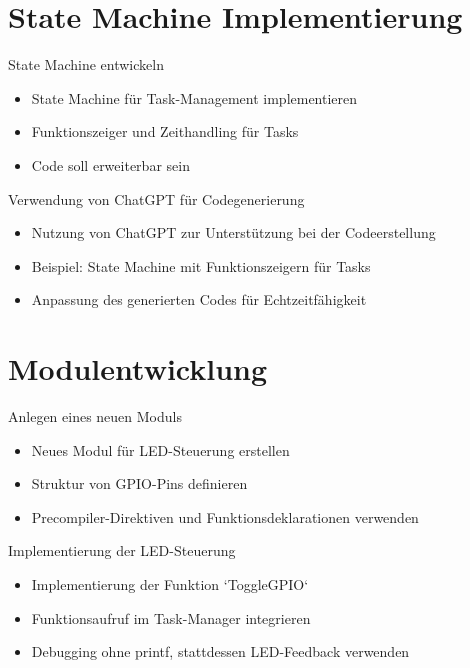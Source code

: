 \documentclass{beamer}
\begin{document}
\section{State Machine Implementierung}
\begin{frame}{State Machine entwickeln}
  \begin{itemize}
    \item State Machine für Task-Management implementieren
    \item Funktionszeiger und Zeithandling für Tasks
    \item Code soll erweiterbar sein
  \end{itemize}
\end{frame}

\begin{frame}{Verwendung von ChatGPT für Codegenerierung}
  \begin{itemize}
    \item Nutzung von ChatGPT zur Unterstützung bei der Codeerstellung
    \item Beispiel: State Machine mit Funktionszeigern für Tasks
    \item Anpassung des generierten Codes für Echtzeitfähigkeit
  \end{itemize}
\end{frame}

\section{Modulentwicklung}
\begin{frame}{Anlegen eines neuen Moduls}
  \begin{itemize}
    \item Neues Modul für LED-Steuerung erstellen
    \item Struktur von GPIO-Pins definieren
    \item Precompiler-Direktiven und Funktionsdeklarationen verwenden
  \end{itemize}
\end{frame}

\begin{frame}{Implementierung der LED-Steuerung}
  \begin{itemize}
    \item Implementierung der Funktion `ToggleGPIO`
    \item Funktionsaufruf im Task-Manager integrieren
    \item Debugging ohne printf, stattdessen LED-Feedback verwenden
  \end{itemize}
\end{frame}
\end{document}
